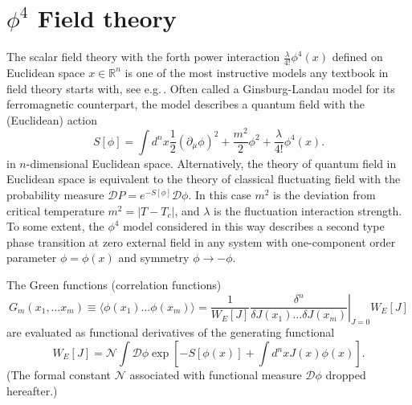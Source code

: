 \documentclass[a4paper,a4paper]{article}
\def\bra{\langle}
\def\ket{\rangle}
\newcommand{\R}{\mathbb{R}}
\def\cN{{\mathcal N}}
\def\cD{{\mathcal D}}             %
\def\eg{e.g.\,}
\def\d{\partial}
\def\bra{\langle}
\def\ket{\rangle}
\begin{document}
\section{$\phi^4$ Field theory} 
The scalar field theory with the forth power interaction 
$\frac{\lambda}{4!}\phi^4(x)$ defined on Euclidean space $x\in\R^n$ is 
one of the most instructive models any textbook in field theory starts with, 
see \eg \cite{Ramond1981}. Often called a Ginsburg-Landau model for its 
ferromagnetic counterpart, the model describes a quantum field 
with the (Euclidean) action 
\begin{equation}
S[\phi] =\int d^n x 
\frac{1}{2}(\d_\mu\phi)^2+ \frac{m^2}{2}\phi^2 + \frac{\lambda}{4!}\phi^4(x).
\label{f4l}
\end{equation}
in $n$-dimensional Euclidean space. Alternatively, the theory of quantum 
field in Euclidean space is equivalent to the theory of classical fluctuating 
field with the probability measure $\cD P = e^{-S[\phi]}\cD\phi$. In this case 
$m^2$ is the deviation from critical temperature $m^2 = |T-T_c|$, and 
$\lambda$ is the fluctuation interaction strength. To some extent, the 
$\phi^4$ model considered in this way describes a second type phase 
transition at zero external field in any system with one-component order 
parameter $\phi=\phi(x)$ and symmetry $\phi \to -\phi$.   

 The Green functions (correlation functions) 
\begin{equation}
G_m(x_1,\ldots x_m) \equiv \bra \phi(x_1)\ldots\phi(x_m)\ket = \frac{1}{W_E[J]} 
\left. \frac{\delta^n}{\delta J(x_1)\ldots\delta J(x_m)}\right|_{J=0} W_E[J]
\label{gfm}
\end{equation}
are evaluated as functional derivatives 
of the generating functional
\begin{equation}
W_E[J] = \cN \int \cD\phi \exp\left[-S[\phi(x)] + \int  d^nx J(x)\phi(x) \right] 
\label{gf}.
\end{equation}
(The formal constant $\cN$ associated with functional measure 
$\cD\phi$ dropped hereafter.)
 
\end{document}
